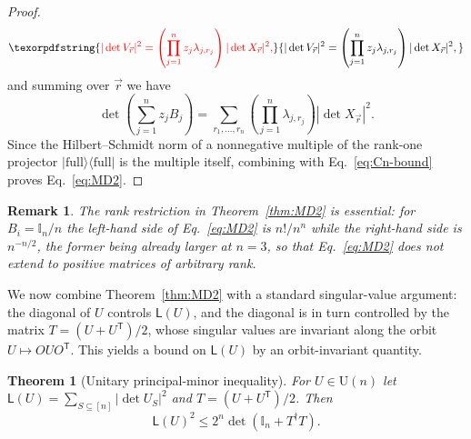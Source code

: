 \documentclass[prx,twocolumn,superscriptaddress,aps,10pt, frontmatterverbose, reprint,footinbib,longbibliography=true]{revtex4-2}
\newtheorem{theorem}{Theorem}
\newtheorem{remark}{Remark}
\newcommand{\trans}{\mathsf{T}}
\providecommand{\DIFaddtex}[1]{{\protect\color{red}#1}} %
\providecommand{\DIFaddbegin}{\protect\color{red}} %
\providecommand{\DIFaddend}{\protect\color{black}} %
\providecommand{\DIFaddtex}[1]{\texorpdfstring{\DIFaddtex{#1}}{#1}} %
\providecommand{\DIFadd}[1]{\texorpdfstring{\DIFaddtex{#1}}{#1}} %
\newcommand{\DIFaddincludegraphics}[2][]{{\color{blue}\fbox{\DIFOincludegraphics[#1]{#2}}}} %
\DeclareRobustCommand{\DIFaddbegin}{\DIFOaddbegin \let\includegraphics\DIFaddincludegraphics} %
\DeclareRobustCommand{\DIFaddend}{\DIFOaddend \let\includegraphics\DIFOincludegraphics} %
\begin{document}
\begin{proof}
\DIFaddbegin \begin{equation}
    \DIFadd{|\det V_{\vec r}|^2
=
\left(\prod_{j=1}^n z_j\lambda_{j,r_j}\right)
|\det X_{\vec r}|^2,
}\end{equation}\DIFaddend 
and summing over $\vec{r}$ we have
\begin{equation}
    [z_1\cdots z_n]\det\!\left(\sum_{j=1}^n z_jB_j\right)
=
\sum_{r_1,\ldots,r_n}
\left(\prod_{j=1}^n\lambda_{j,r_j}\right)
|\det X_{\vec r}|^2.
\end{equation}
Since the Hilbert--Schmidt norm of a nonnegative multiple of the rank-one projector $|\mathrm{full}\rangle\langle\mathrm{full}|$ is the multiple itself, combining with Eq.~\eqref{eq:Cn-bound} proves Eq.~\eqref{eq:MD2}. \end{proof}

\begin{remark}
The rank restriction in Theorem~\ref{thm:MD2} is essential: for $B_i=\mathbb{I}_n/n$ the left-hand side of Eq.~\eqref{eq:MD2} is $n!/n^n$ while the right-hand side is $n^{-n/2}$, the former being already larger at $n=3$, so that Eq.~\eqref{eq:MD2} does not extend to \DIFaddbegin \DIFadd{positive }\DIFaddend matrices of arbitrary rank.\end{remark}

We now combine Theorem~\ref{thm:MD2} with a standard singular-value argument: the diagonal of $U$ controls $\mathsf{L}(U)$, and the diagonal is in turn controlled by the matrix $T=(U+U^{\trans})/2$, whose singular values are invariant along the orbit $U\mapsto OUO^{\trans}$. This yields a bound on $\mathsf{L}(U)$ by an orbit-invariant quantity.

\begin{theorem}[Unitary principal-minor inequality]
\label{thm:UL}
For $U\in \mathrm{U}(n)$ let $\mathsf{L}(U)=\sum_{S\subseteq[n]}|\det U_S|^2$ and $T=(U+U^{\trans})/2$. Then
\begin{equation}
    \mathsf{L}(U)^2\le 2^n\det\!\left(\mathbb{I}_n+T^\dagger T\right).
    \label{eq:UL}
\end{equation}
\end{theorem}
\end{document}
